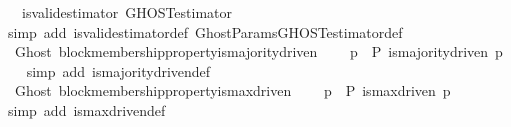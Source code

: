 \begin{isabellebody}
\ \ {\isasymLongrightarrow}\ is{\isacharunderscore}valid{\isacharunderscore}estimator\ GHOST{\isacharunderscore}estimator{\isachardoublequoteclose}\isanewline
%
\isadelimproof
\ \ %
\endisadelimproof
%
\isatagproof
{}\isamarkupfalse%
\ {\isacharparenleft}simp\ add{\isacharcolon}\ is{\isacharunderscore}valid{\isacharunderscore}estimator{\isacharunderscore}def\ GhostParams{\isachardot}GHOST{\isacharunderscore}estimator{\isacharunderscore}def{\isacharparenright}\isanewline
\ \ \isamarkupfalse%
%
\endisatagproof
{\isafoldproof}%
%
\isadelimproof
\isanewline
%
\endisadelimproof
\isanewline
{}\isamarkupfalse%
\ {\isacharparenleft}\ Ghost{\isacharparenright}\ block{\isacharunderscore}membership{\isacharunderscore}property{\isacharunderscore}is{\isacharunderscore}majority{\isacharunderscore}driven\ {\isacharcolon}\isanewline
\ \ {\isachardoublequoteopen}{\isasymforall}\ p\ {\isasymin}\ P{\isachardot}\ is{\isacharunderscore}majority{\isacharunderscore}driven\ p{\isachardoublequoteclose}\isanewline
%
\isadelimproof
\ \ %
\endisadelimproof
%
\isatagproof
{}\isamarkupfalse%
\ {\isacharparenleft}simp\ add{\isacharcolon}\ is{\isacharunderscore}majority{\isacharunderscore}driven{\isacharunderscore}def{\isacharparenright}\isanewline
\ \ \isanewline
\ \ \isamarkupfalse%
%
\endisatagproof
{\isafoldproof}%
%
\isadelimproof
\isanewline
%
\endisadelimproof
\isanewline
{}\isamarkupfalse%
\ {\isacharparenleft}\ Ghost{\isacharparenright}\ block{\isacharunderscore}membership{\isacharunderscore}property{\isacharunderscore}is{\isacharunderscore}max{\isacharunderscore}driven\ {\isacharcolon}\isanewline
\ \ {\isachardoublequoteopen}{\isasymforall}\ p\ {\isasymin}\ P{\isachardot}\ is{\isacharunderscore}max{\isacharunderscore}driven\ p{\isachardoublequoteclose}\isanewline
%
\isadelimproof
\ \ %
\endisadelimproof
%
\isatagproof
{}\isamarkupfalse%
\ {\isacharparenleft}simp\ add{\isacharcolon}\ is{\isacharunderscore}max{\isacharunderscore}driven{\isacharunderscore}def{\isacharparenright}\isanewline
\ \ \isanewline
\ \ \isanewline
\ \ \isamarkupfalse%
%
\endisatagproof
{\isafoldproof}%
%
\isadelimproof
\isanewline
%
\endisadelimproof
%
\isadelimtheory
\isanewline
%
\endisadelimtheory
%
\isatagtheory
{}\isamarkupfalse%
%
\endisatagtheory
{\isafoldtheory}%
%
\isadelimtheory
%
\endisadelimtheory
%
\end{isabellebody}%
\endinput

